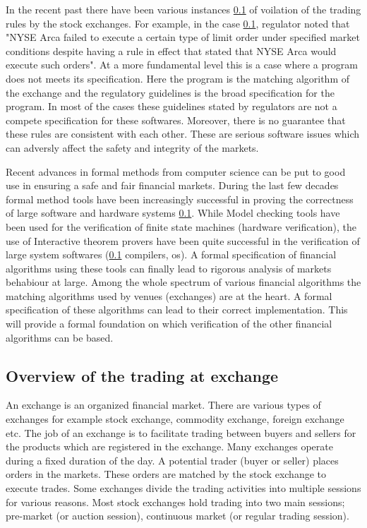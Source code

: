 \documentclass[a4paper,UKenglish,cleveref, autoref]{lipics-v2019}
\begin{document}
In the recent past there have been various instances \ref{} of voilation of the trading rules by the stock exchanges. For example, in the case \ref{}, regulator noted that "NYSE Arca failed to execute a certain type of limit order under specified market conditions despite having a rule in effect that stated that NYSE Arca would execute such orders". At a more fundamental level this is a case where a program does not meets its specification. Here the program is the matching algorithm of the exchange and the regulatory guidelines is the broad specification for the program. In most of the cases these guidelines stated by regulators are not a compete specification for these softwares. Moreover, there is no guarantee that these rules are consistent with each other. These are serious software issues which can adversly affect the safety and integrity of the markets. 

Recent advances in formal methods from computer science can be put to good use in ensuring a safe and fair financial markets. During the last few decades formal method tools have been increasingly successful in proving the correctness of large software and hardware systems \ref{}. While Model checking tools have been used for the verification of finite state machines (hardware verification),  the use of Interactive theorem provers have been quite successful in the verification of large system softwares (\ref{} compilers, os). A formal specification of financial algorithms using these tools can finally lead to rigorous analysis of markets behabiour at large. Among the whole spectrum of various financial algorithms the matching algorithms used by venues (exchanges) are at the heart. A formal specification of these algorithms can lead to their correct implementation. This will provide a formal foundation on which verification of the other financial algorithms can be based. 

\subsection{Overview of the trading at exchange}

An exchange is an organized financial market. There are various types of exchanges for example stock exchange, commodity exchange, foreign exchange etc. The job of an exchange is to facilitate trading between buyers and sellers for the products which are registered in the exchange. Many exchanges operate during a fixed duration of the day. A potential trader (buyer or seller) places orders in the markets. These orders are matched by the stock exchange to execute trades. Some exchanges divide the trading activities into multiple sessions for various reasons. Most stock exchanges hold trading into two main sessions; pre-market (or auction session), continuous  market (or regular trading session). 
\end{document}
